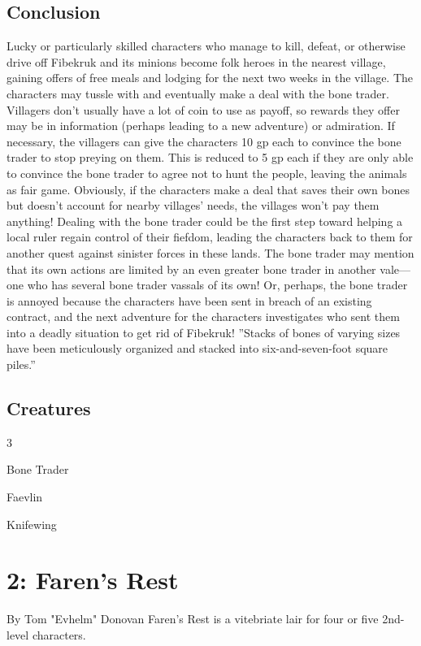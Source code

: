 \documentclass[10pt,a4paper,twoside,twocolumn,openany,bg=print,nodeprecatedcode]{dndbook}
\begin{document}
\section{Conclusion}
Lucky or particularly skilled characters who manage to kill, defeat, or otherwise drive off Fibekruk and its minions become folk heroes in the nearest village, gaining offers of free meals and lodging for the next two weeks in the village.
The characters may tussle with and eventually make a deal with the bone trader. Villagers don't usually have a lot of coin to use as payoff, so rewards they offer may be in information (perhaps leading to a new adventure) or admiration. If necessary, the villagers can give the characters 10 gp each to convince the bone trader to stop preying on them. This is reduced to 5 gp each if they are only able to convince the bone trader to agree not to hunt the people, leaving the animals as fair game. Obviously, if the characters make a deal that saves their own bones but doesn't account for nearby villages' needs, the villages won't pay them anything!
Dealing with the bone trader could be the first step toward helping a local ruler regain control of their fiefdom, leading the characters back to them for another quest against sinister forces in these lands. The bone trader may mention that its own actions are limited by an even greater bone trader in another vale—one who has several bone trader vassals of its own! Or, perhaps, the bone trader is annoyed because the characters have been sent in breach of an existing contract, and the next adventure for the characters investigates who sent them into a deadly situation to get rid of Fibekruk!
\DndQuote%
{}
{''Stacks of bones of varying sizes have been meticulously organized and stacked into six-and-seven-foot square piles.''}
{}
\section{Creatures}

\begin{itemize}
\begin{multicols}{3}
\item Bone Trader
\item Faevlin
\item Knifewing
\end{multicols}

\end{itemize}

\chapter{2: Faren's Rest}
By Tom "Evhelm" Donovan
Faren's Rest is a vitebriate lair for four or five 2nd-level characters.
\end{document}
